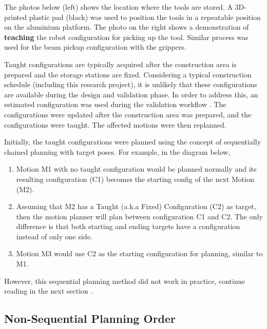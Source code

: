 The photos below (left) shows the location where the tools are stored. A 3D-printed plastic pad (black) was used to position the tools in a repeatable position on the aluminium platform. The photo on the right shows a demonstration of \textbf{teaching }the robot configuration for picking up the tool. Similar process was used for the beam pickup configuration with the grippers.




Taught configurations are typically acquired after the construction area is prepared and the storage stations are fixed. Considering a typical construction schedule (including this research project), it is unlikely that these configurations are available during the design and validation phase. In order to address this, an estimated configuration was used during the validation workflow . The configurations were updated after the construction area was prepared, and the configurations were taught. The affected motions were then replanned.

Initially, the taught configurations were planned using the concept of sequentially chained planning with target poses. For example, in the diagram below,

\begin{enumerate}
	\item Motion M1 with no taught configuration would be planned normally and its resulting configuration (C1) becomes the starting config of the next Motion (M2). 

	\item Assuming that M2 has a Taught (a.k.a Fixed) Configuration (C2) as target, then the motion planner will plan between configuration C1 and C2. The only difference is that both starting and ending targets have a configuration instead of only one side.

	\item Motion M3 would use C2 as the starting configuration for planning, similar to M1.

\end{enumerate}



However, this sequential planning method did not work in practice, continue reading in the next section .

\subsection{Non-Sequential Planning Order}
\label{subsection:exploration-3-non-sequential-planning-order}

